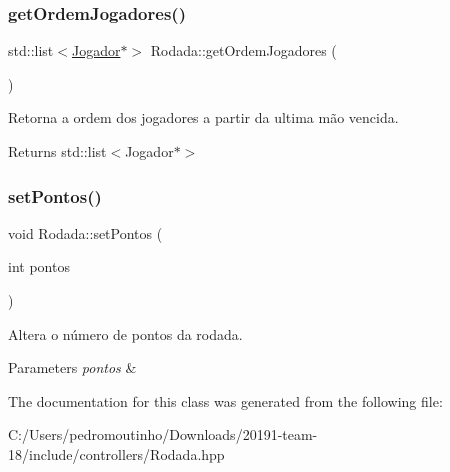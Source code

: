 \subsubsection{\texorpdfstring{getOrdemJogadores()}{getOrdemJogadores()}}
{\footnotesize\ttfamily std\+::list$<$\mbox{\hyperlink{class_jogador}{Jogador}}$\ast$$>$ Rodada\+::get\+Ordem\+Jogadores (\begin{DoxyParamCaption}{ }\end{DoxyParamCaption})}



Retorna a ordem dos jogadores a partir da ultima mão vencida. 

\begin{DoxyReturn}{Returns}
std\+::list$<$\+Jogador$\ast$$>$ 
\end{DoxyReturn}
\mbox{\label{class_rodada_aa8ca4b5f5b62991292a33188a1004fd1}} 
\subsubsection{\texorpdfstring{setPontos()}{setPontos()}}
{\footnotesize\ttfamily void Rodada\+::set\+Pontos (\begin{DoxyParamCaption}\item[{int}]{pontos }\end{DoxyParamCaption})}



Altera o número de pontos da rodada. 


\begin{DoxyParams}{Parameters}
{\em pontos} & \\
\hline
\end{DoxyParams}


The documentation for this class was generated from the following file\+:\begin{DoxyCompactItemize}
\item 
C\+:/\+Users/pedromoutinho/\+Downloads/20191-\/team-\/18/include/controllers/Rodada.\+hpp\end{DoxyCompactItemize}
